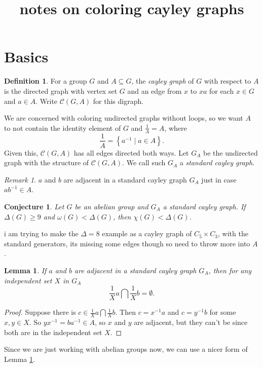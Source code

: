 \documentclass[12pt]{article}
\title{notes on coloring cayley graphs}
\theoremstyle{plain}
\newtheorem{lem}[thm]{Lemma}
\newtheorem{conjecture}[thm]{Conjecture}
\theoremstyle{definition}
\newtheorem{defn}{Definition}
\theoremstyle{remark}
\newtheorem*{remark}{Remark}
\newcommand{\fancy}[1]{\mathcal{#1}}
\newcommand{\C}[1]{\fancy{C}_{#1}}
\newcommand{\setbs}[2]{\left\{ #1 \mid #2 \right\}}
\def\C{\fancy{C}}
\begin{document}
\maketitle
\section{Basics}

\begin{defn}
For a group $G$ and $A \subseteq G$, the \emph{cayley graph} of $G$ with respect to $A$ is the directed graph with vertex set $G$ and an edge from $x$ to $xa$ for each $x \in G$ and $a \in A$.
Write $\C(G,A)$ for this digraph.
\end{defn}

We are concerned with coloring undirected graphs without loops, so we want $A$ to not contain the identity element of $G$ and $\frac{1}{A} = A$, where
\[\frac{1}{A} = \setbs{a^{-1}}{a \in A}.\]
Given this, $\C(G,A)$ has all edges directed both ways.  Let $G_A$ be the undirected graph with the structure of $\C(G,A)$.  We call such $G_A$ a \emph{standard cayley graph}.

\begin{remark}
$a$ and $b$ are adjacent in a standard cayley graph $G_A$ just in case $ab^{-1} \in A$.
\end{remark}


\begin{conjecture}
Let $G$ be an abelian group and $G_A$ a standard cayley graph.  If $\Delta(G) \ge 9$ and $\omega(G) < \Delta(G)$, then $\chi(G) < \Delta(G)$.
\end{conjecture}
i am trying to make the $\Delta=8$ example as a cayley graph of $C_5 \times C_3$, with the standard generators, its missing some edges though so need to throw more into $A$.

\begin{lem}\label{IndependentSetShiftingLemma}
If $a$ and $b$ are adjacent in a standard cayley graph $G_A$, then for any independent set $X$ in $G_A$
\[\frac{1}{X}a \bigcap \frac{1}{X}b = \emptyset.\]
\end{lem}
\begin{proof}
Suppose there is $c \in \frac{1}{X}a \bigcap \frac{1}{X}b$.  Then $c = x^{-1}a$ and $c = y^{-1}b$ for some $x,y \in X$. So $yx^{-1} = ba^{-1} \in A$, so $x$ and $y$ are adjacent, but they can't be since 
both are in the independent set $X$.
\end{proof}
Since we are just working with abelian groups now, we can use a nicer form of Lemma \ref{IndependentSetShiftingLemma}.
\end{document}
